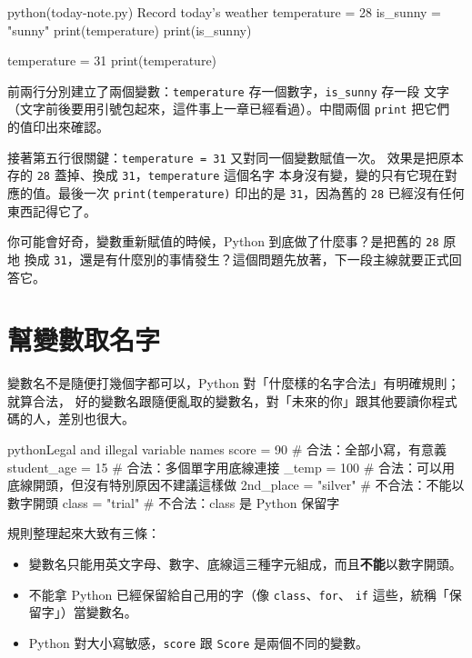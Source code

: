 \begin{example}{python}{(today-note.py) Record today's weather}
temperature = 28
is_sunny = "sunny"
print(temperature)
print(is_sunny)

temperature = 31
print(temperature)
\end{example}


前兩行分別建立了兩個變數：\texttt{temperature} 存一個數字，\texttt{is\_sunny} 存一段
文字（文字前後要用引號包起來，這件事上一章已經看過）。中間兩個 \texttt{print} 把它們
的值印出來確認。

接著第五行很關鍵：\texttt{temperature = 31} 又對同一個變數賦值一次。
效果是把原本存的 \texttt{28} 蓋掉、換成 \texttt{31}，\texttt{temperature} 這個名字
本身沒有變，變的只有它現在對應的值。最後一次 \texttt{print(temperature)} 印出的是
\texttt{31}，因為舊的 \texttt{28} 已經沒有任何東西記得它了。

你可能會好奇，變數重新賦值的時候，Python 到底做了什麼事？是把舊的 \texttt{28} 原地
換成 \texttt{31}，還是有什麼別的事情發生？這個問題先放著，下一段主線就要正式回答它。

\section{幫變數取名字}
\label{sec:variable-naming}

變數名不是隨便打幾個字都可以，Python 對「什麼樣的名字合法」有明確規則；就算合法，
好的變數名跟隨便亂取的變數名，對「未來的你」跟其他要讀你程式碼的人，差別也很大。

\begin{code}{python}{Legal and illegal variable names}
score = 90          # 合法：全部小寫，有意義
student_age = 15    # 合法：多個單字用底線連接
_temp = 100          # 合法：可以用底線開頭，但沒有特別原因不建議這樣做
2nd_place = "silver"   # 不合法：不能以數字開頭
class = "trial"       # 不合法：class 是 Python 保留字
\end{code}

規則整理起來大致有三條：

\begin{itemize}
\item 變數名只能用英文字母、數字、底線這三種字元組成，而且\textbf{不能}以數字開頭。
\item 不能拿 Python 已經保留給自己用的字（像 \texttt{class}、\texttt{for}、
\texttt{if} 這些，統稱「保留字」）當變數名。
\item Python 對大小寫敏感，\texttt{score} 跟 \texttt{Score} 是兩個不同的變數。
\end{itemize}

